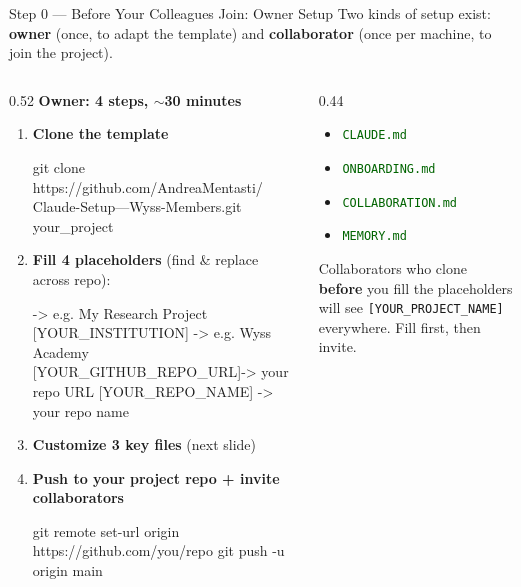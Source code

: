 \documentclass[aspectratio=169,11pt,dvipsnames]{beamer}
\newcommand{\file}[1]{\textcolor{darkgreen}{\nolinkurl{#1}}}
\begin{document}
\begin{frame}{Step 0 — Before Your Colleagues Join: Owner Setup}
\scriptsize
  Two kinds of setup exist: \textbf{owner} (once, to adapt the template) and
  \textbf{collaborator} (once per machine, to join the project).
  \vspace{0.2cm}
  \begin{columns}[T]
    \begin{column}{0.52\textwidth}
      \textbf{Owner: 4 steps, $\sim$30 minutes}
      \begin{enumerate}\setlength\itemsep{5pt}
        \item \textbf{Clone the template}
          \begin{codebox}
git clone https://github.com/AndreaMentasti/
  Claude-Setup---Wyss-Members.git your_project
          \end{codebox}
        \item \textbf{Fill 4 placeholders} (find \& replace across repo):
          \begin{codebox}
   -> e.g. My Research Project
[YOUR_INSTITUTION]    -> e.g. Wyss Academy
[YOUR_GITHUB_REPO_URL]-> your repo URL
[YOUR_REPO_NAME]      -> your repo name
          \end{codebox}
        \item \textbf{Customize 3 key files} (next slide)
        \item \textbf{Push to your project repo + invite collaborators}
          \begin{codebox}
git remote set-url origin https://github.com/you/repo
git push -u origin main
          \end{codebox}
      \end{enumerate}
    \end{column}
    \begin{column}{0.44\textwidth}
      \begin{greenbox}[title=Files with placeholders to fill]
        \small
        \begin{itemize}
          \item \file{CLAUDE.md}
          \item \file{ONBOARDING.md}
          \item \file{COLLABORATION.md}
          \item \file{MEMORY.md}
        \end{itemize}
      \end{greenbox}
      \vspace{0.3cm}
      \begin{alertbox}[title=Do this before sharing the repo]
        \small Collaborators who clone \textbf{before} you fill the
        placeholders will see \texttt{[YOUR\_PROJECT\_NAME]}
        everywhere. Fill first, then invite.
      \end{alertbox}
    \end{column}
  \end{columns}
\end{frame}
\end{document}
